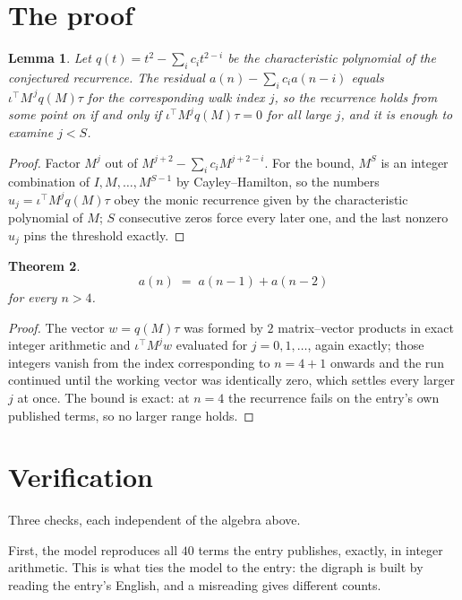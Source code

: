 \documentclass[11pt,a4paper]{article}
\theoremstyle{plain}
\newtheorem{theorem}{Theorem}
\newtheorem{lemma}[theorem]{Lemma}
\theoremstyle{definition}
\begin{document}
\section{The proof}

\begin{lemma}\label{lem:crit}
Let $q(t)=t^{2}-\sum_i c_it^{2-i}$ be the characteristic polynomial of the
conjectured recurrence. The residual $a(n)-\sum_ic_ia(n-i)$ equals
$\iota^{\!\top}M^{\,j}q(M)\tau$ for the corresponding walk index $j$, so the recurrence
holds from some point on if and only if $\iota^{\!\top}M^{j}q(M)\tau=0$ for all large $j$,
and it is enough to examine $j<S$.
\end{lemma}

\begin{proof}
Factor $M^{j}$ out of $M^{j+2}-\sum_ic_iM^{j+2-i}$. For the bound, $M^{S}$
is an integer combination of $I,M,\dots,M^{S-1}$ by Cayley--Hamilton, so the numbers
$u_j=\iota^{\!\top}M^{j}q(M)\tau$ obey the monic recurrence given by the characteristic
polynomial of $M$; $S$ consecutive zeros force every later one, and the last nonzero $u_j$
pins the threshold exactly.
\end{proof}

\begin{theorem}
\[
a(n)\;=\;a(n-1) + a(n-2)
\]
for every $n>4$.
\end{theorem}

\begin{proof}
The vector $w=q(M)\tau$ was formed by $2$ matrix--vector products in exact integer
arithmetic and $\iota^{\!\top}M^{j}w$ evaluated for $j=0,1,\dots$, again exactly; those
integers vanish from the index corresponding to $n=4+1$ onwards and the run continued
until the working vector was identically zero, which settles every larger $j$ at once. The bound is exact: at $n=4$ the recurrence fails on the entry's own published terms, so no larger range holds.
\end{proof}

\section{Verification}

Three checks, each independent of the algebra above.

First, the model reproduces all $40$ terms the entry publishes, exactly, in integer
arithmetic. This is what ties the model to the entry: the digraph is built by reading the
entry's English, and a misreading gives different counts.
\end{document}
